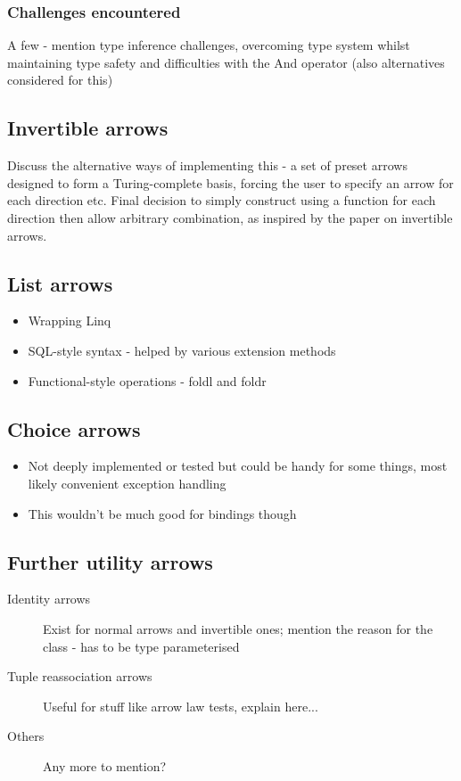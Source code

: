 \documentclass[12pt,twoside,notitlepage]{report}
\begin{document}
\subsubsection*{Challenges encountered}

A few - mention type inference challenges, overcoming type system whilst maintaining type safety and difficulties with the And operator (also alternatives considered for this)

\subsection{Invertible arrows}

Discuss the alternative ways of implementing this - a set of preset arrows designed to form a Turing-complete basis, forcing the user to specify an arrow for each direction etc. Final decision to simply construct using a function for each direction then allow arbitrary combination, as inspired by the paper on invertible arrows.

\subsection{List arrows}

\begin{itemize}
	\item Wrapping Linq
	\item SQL-style syntax - helped by various extension methods
	\item Functional-style operations - foldl and foldr
\end{itemize}

\subsection{Choice arrows}

\begin{itemize}
	\item Not deeply implemented or tested but could be handy for some things, most likely convenient exception handling
	\item This wouldn't be much good for bindings though
\end{itemize}

\subsection{Further utility arrows}

\begin{description}
	\item[Identity arrows] Exist for normal arrows and invertible ones; mention the reason for the class - has to be type parameterised
	\item[Tuple reassociation arrows] Useful for stuff like arrow law tests, explain here...
	\item[Others] Any more to mention?
\end{description}
\end{document}
